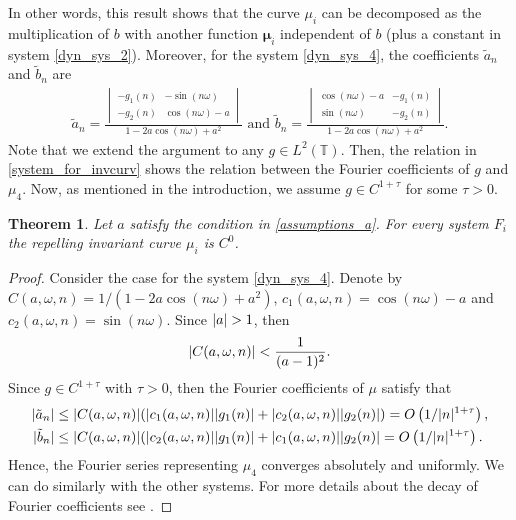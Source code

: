 \documentclass[12pt]{article}
\newcommand{\T}{\mathbb{T}}
\theoremstyle{plain}
\newtheorem{thm}[defn]{Theorem}
\theoremstyle{remark}
\DeclarePairedDelimiter\abs{\lvert}{\rvert}
\theoremstyle{definition}
\begin{document}
In other words, this result shows that the curve $\mu_i$ can be decomposed as the multiplication of $b$ with another function $\boldsymbol\mu_i$ independent of $b$ (plus a constant in system \eqref{dyn_sys_2}). Moreover, for the system \eqref{dyn_sys_4}, the coefficients $\tilde{a}_n$ and $\tilde{b}_n$ are
\begin{align*}
    \tilde{a}_n = \frac{
    \begin{vmatrix}
            -g_1(n) & -\sin(n\omega)\\
            -g_2(n) & \cos(n\omega)-a
        \end{vmatrix}
    }{1-2a\cos(n\omega)+a^2}
    \text{ and }
    \tilde{b}_n = \frac{
    \begin{vmatrix}
        \cos(n\omega)-a & -g_1(n)\\
        \sin(n\omega) & -g_2(n)
    \end{vmatrix}
    }{1-2a\cos(n\omega)+a^2}.
\end{align*}
Note that we extend the argument to any $g\in L^2(\T)$. Then, the relation in \eqref{system_for_invcurv} shows the relation between the Fourier coefficients of $g$ and $\mu_4$. Now, as mentioned in the introduction, we assume $g\in C^{1+\tau}$ for some $\tau>0$.
\begin{thm}\label{regularity_mu}
    Let $a$ satisfy the condition in \eqref{assumptions_a}. For every system $F_i$ the repelling invariant curve $\mu_i$ is $C^0$.
\end{thm}
\begin{proof}
    Consider the case for the system \eqref{dyn_sys_4}. Denote by $C(a,\omega,n)=1/(1-2a\cos(n\omega)+a^2)$, $c_1(a,\omega,n)=\cos(n\omega)-a$ and $c_2(a,\omega,n)=\sin(n\omega)$. Since $\abs{a}>1$, then 
    \begin{align*}
        \abs{C(a,\omega,n)}<\frac{1}{(a -1)^2}.
    \end{align*}
    Since $g\in C^{1+\tau}$ with $\tau>0$, then the Fourier coefficients of $\mu$ satisfy that
    \begin{align*}
        \abs{\tilde{a}_n}&\leq \abs{C(a,\omega,n)}(\abs{c_1(a,\omega,n)} \abs{g_1(n)} + \abs{c_2(a,\omega,n)} \abs{g_2(n)}) = O\left(1/\abs{n}^{1+\tau}\right),\\
        \abs{\tilde{b}_n}&\leq \abs{C(a,\omega,n)}(\abs{c_2(a,\omega,n)} \abs{g_1(n)} + \abs{c_1(a,\omega,n)} \abs{g_2(n)} = O\left(1/\abs{n}^{1+\tau}\right).
    \end{align*}
    Hence, the Fourier series representing $\mu_4$ converges absolutely and uniformly. We can do similarly with the other systems.
    For more details about the decay of Fourier coefficients see \cite{katz2004ha,Stein2003Four}.
\end{proof}
\end{document}
